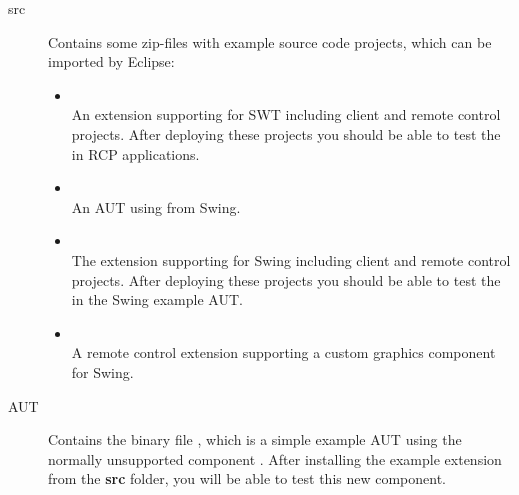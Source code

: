 \begin{description}
 \item[src] Contains some zip-files with example source code projects, which
            can be imported by Eclipse:
 \begin{itemize}
   \item {}\\
         An extension supporting  for SWT including client
         and remote control projects. After deploying these projects you should
         be able to test the  in RCP applications.
   \item {}\\
         An AUT using  from Swing.
   \item {}\\
         The  extension supporting  for Swing including
         client and remote control projects. After deploying these projects you
         should be able to test the  in the Swing example AUT.
   \item {}\\
         A remote control extension supporting a custom graphics
         component for Swing.
 \end{itemize}
 \item[AUT]  Contains the binary file , which is a simple
 example AUT using the normally unsupported component . After
 installing the  example extension from the \textbf{src}
 folder, you will be able to test this new component.
\end{description}
